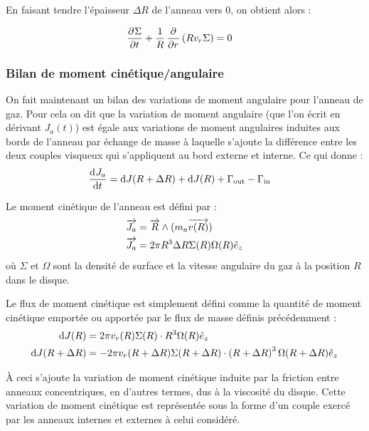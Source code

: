 En faisant tendre l'épaisseur $\Delta R$ de l'anneau vers 0, on obtient alors :
\begin{important}
\begin{align}
\mathinner{ \dfrac{\partial{^{}}\Sigma}{\partial{{t}^{}}} } + \frac{1}{R}\mathinner{ \dfrac{\partial{^{}}}{\partial{{r}^{}}} }\left(R v_r \Sigma\right)&=0\label{eq:conservation_masse}
\end{align}
\end{important}

\subsubsection{Bilan de moment cinétique/angulaire}
On fait maintenant un bilan des variations de moment angulaire pour l'anneau de gaz. Pour cela on dit que la variation de moment angulaire (que l'on écrit en dérivant $J_a(t)$) est égale aux variations de moment angulaires induites aux bords de l'anneau par échange de masse à laquelle s'ajoute la différence entre les deux couples visqueux qui s'appliquent au bord externe et interne. Ce qui donne : 
\begin{align}
\mathinner{ \dfrac{\operatorname{d \!}{^{}}J_a}{\operatorname{d \!}{{t}^{}}} } &= \operatorname{d \!} J(R+\Delta R) + \operatorname{d \!} J(R) + \Gamma_\text{out} - \Gamma_\text{in}\label{eq:cons_J_a}
\end{align}

Le moment cinétique de l'anneau est défini par :
\begin{align}
\vect{J_a} &= \vect{R} \wedge (m_a\vect{v(R)}) \nonumber\\
\vect{J_a} &= 2\pi R^3 \Delta R \Sigma(R)\Omega(R)\hat{e}_z\label{eq:J_a}
\end{align}
où $\Sigma$ et $\Omega$ sont la densité de surface et la vitesse angulaire du gaz à la position $R$ dans le disque.

Le flux de moment cinétique est simplement défini comme la quantité de moment cinétique emportée ou apportée par le flux de masse définis précédemment  :
\begin{subequations}
\begin{align}
\operatorname{d \!} J(R) &= 2\pi v_r(R) \Sigma(R)\cdot R^3\Omega(R)\hat{e}_z\label{eq:dJ_in}\\
\operatorname{d \!} J(R+\Delta R) &= -2\pi v_r(R+\Delta R) \Sigma(R+\Delta R)\cdot \left(R+\Delta R\right)^3\Omega(R+\Delta R)\hat{e}_z\label{eq:dJ_out}
\end{align}\label{eq:dJ}
\end{subequations}

\bigskip

À ceci s'ajoute la variation de moment cinétique induite par la friction entre anneaux concentriques, en d'autres termes, dus à la viscosité du disque. Cette variation de moment cinétique est représentée sous la forme d'un couple exercé par les anneaux internes et externes à celui considéré. 

